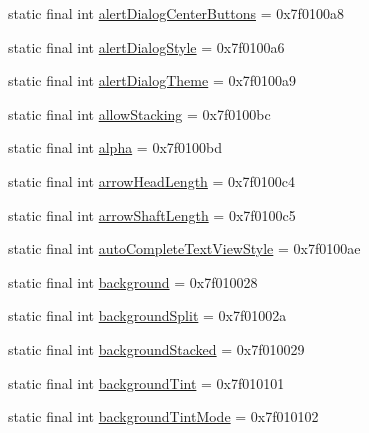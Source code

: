 \begin{CompactItemize}
\item 
static final int \hyperlink{classandroid_1_1support_1_1graphics_1_1drawable_1_1_r_1_1attr_00f3ccebf2b532f667f33cee934f1206}{alertDialogCenterButtons} = 0x7f0100a8
\item 
static final int \hyperlink{classandroid_1_1support_1_1graphics_1_1drawable_1_1_r_1_1attr_cf0fb3716020c344a4befc2d5527e377}{alertDialogStyle} = 0x7f0100a6
\item 
static final int \hyperlink{classandroid_1_1support_1_1graphics_1_1drawable_1_1_r_1_1attr_9e2835f4d9a3b53502da6e8d5edefb2a}{alertDialogTheme} = 0x7f0100a9
\item 
static final int \hyperlink{classandroid_1_1support_1_1graphics_1_1drawable_1_1_r_1_1attr_2bf2d70654018a8a9e20243f09abe14c}{allowStacking} = 0x7f0100bc
\item 
static final int \hyperlink{classandroid_1_1support_1_1graphics_1_1drawable_1_1_r_1_1attr_447cc8ccbf7ec208b553db95726a8468}{alpha} = 0x7f0100bd
\item 
static final int \hyperlink{classandroid_1_1support_1_1graphics_1_1drawable_1_1_r_1_1attr_912f6e8dee2f755d60ae860052f1de0b}{arrowHeadLength} = 0x7f0100c4
\item 
static final int \hyperlink{classandroid_1_1support_1_1graphics_1_1drawable_1_1_r_1_1attr_f7a8bbc7d9f30ed464b0ca15d5ff00a6}{arrowShaftLength} = 0x7f0100c5
\item 
static final int \hyperlink{classandroid_1_1support_1_1graphics_1_1drawable_1_1_r_1_1attr_0b27365290046197e7ff3c5938e76555}{autoCompleteTextViewStyle} = 0x7f0100ae
\item 
static final int \hyperlink{classandroid_1_1support_1_1graphics_1_1drawable_1_1_r_1_1attr_705deef302c54fcc5a45cc95a93271de}{background} = 0x7f010028
\item 
static final int \hyperlink{classandroid_1_1support_1_1graphics_1_1drawable_1_1_r_1_1attr_c6c56c819041e89cfc1ff1426e3b0305}{backgroundSplit} = 0x7f01002a
\item 
static final int \hyperlink{classandroid_1_1support_1_1graphics_1_1drawable_1_1_r_1_1attr_23f3c068803df9b78657558fdb821ccc}{backgroundStacked} = 0x7f010029
\item 
static final int \hyperlink{classandroid_1_1support_1_1graphics_1_1drawable_1_1_r_1_1attr_a3166a7f244a714503e653aad05d1854}{backgroundTint} = 0x7f010101
\item 
static final int \hyperlink{classandroid_1_1support_1_1graphics_1_1drawable_1_1_r_1_1attr_7747a9f3c067ffc3c14284f17d9fb3a1}{backgroundTintMode} = 0x7f010102

\end{CompactItemize}
